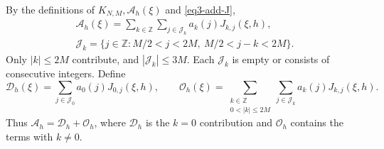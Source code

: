 \documentclass[reqno,12pt]{amsart}
\def \Z {\mathbb Z}
\numberwithin{equation}{section}
\begin{document}
By the definitions of $K_{N,M}, \mathcal A_h(\xi)$ and \eqref{eq3-add-J}, 
\begin{equation}
 \begin{gathered}
 \mathcal A_h(\xi)=\sum_{k\in\Z}\sum_{j\in\mathcal J_k}
          a_k(j)J_{k,j}(\xi,h),\\
 \mathcal J_k=\{j\in\Z:M/2<j<2M,\ M/2<j-k<2M\}.
 \end{gathered}
 \label{eq3-add-mode-expansion}
\end{equation}
Only $|k|\le2M$ contribute, and $|\mathcal J_k|\le3M$.
Each $\mathcal J_k$ is empty or consists of consecutive integers.
Define
\[
 \mathcal D_h(\xi)=\sum_{j\in\mathcal J_0}a_0(j)J_{0,j}(\xi,h),\qquad
 \mathcal O_h(\xi)=\sum_{\substack{k\in\Z\\0<|k|\le2M}}
                       \sum_{j\in\mathcal J_k}a_k(j)J_{k,j}(\xi,h).
\]
Thus $\mathcal A_h=\mathcal D_h+\mathcal O_h$, where $\mathcal D_h$ is the $k=0$ contribution and $\mathcal O_h$ contains the terms with $k\ne0$. 
\end{document}
